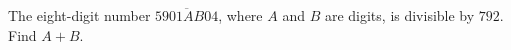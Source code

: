 The eight-digit number $\overline{5901AB04}$, where $A$ and $B$ are digits, is divisible by $792$. Find $A+B$.

